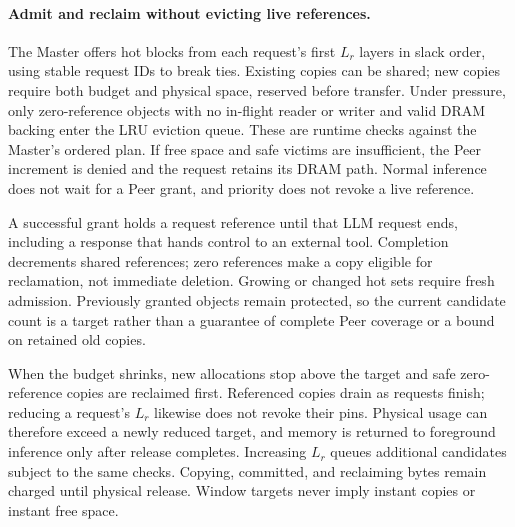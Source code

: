 \paragraph{Admit and reclaim without evicting live references.}
The Master offers hot blocks from each request's first $L_r$ layers in slack order,
using stable request IDs to break ties. Existing copies can be shared;
new copies require both budget and physical space, reserved before
transfer. Under pressure, only zero-reference objects with no in-flight
reader or writer and valid DRAM backing enter the LRU eviction queue.
These are runtime checks against the Master's ordered plan.
If free space and safe victims are insufficient, the Peer increment is
denied and the request retains its DRAM path. Normal inference does not
wait for a Peer grant, and priority does not revoke a live reference.

A successful grant holds a request reference until that LLM request
ends, including a response that hands control to an external tool.
Completion decrements shared references; zero references make a copy
eligible for reclamation, not immediate deletion. Growing or changed
hot sets require fresh admission. Previously granted objects remain
protected, so the current candidate count is a target rather than a
guarantee of complete Peer coverage or a bound on retained old copies.

When the budget shrinks, new allocations stop above the target and
safe zero-reference copies are reclaimed first. Referenced copies drain
as requests finish; reducing a request's $L_r$ likewise does not revoke their pins.
Physical usage can therefore exceed a newly reduced target, and memory
is returned to foreground inference only after release completes.
Increasing $L_r$ queues additional candidates subject to the same checks.
Copying, committed, and reclaiming bytes remain charged until physical
release. Window targets never imply instant copies or instant free space.
